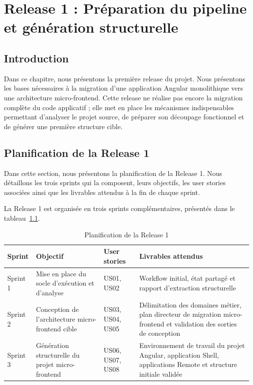 \chapter{Release 1 : Préparation du pipeline et génération structurelle}

\section*{Introduction}

Dans ce chapitre, nous présentons la première release du projet. Nous présentons les bases nécessaires à la migration d'une application Angular monolithique vers une architecture micro-frontend. Cette release ne réalise pas encore la migration complète du code applicatif ; elle met en place les mécanismes indispensables permettant d'analyser le projet source, de préparer son découpage fonctionnel et de générer une première structure cible.

\section{Planification de la Release 1}

Dans cette section, nous présentons la planification de la Release 1. Nous détaillons les trois sprints qui la composent, leurs objectifs, les user stories associées ainsi que les livrables attendus à la fin de chaque sprint.

La Release 1 est organisée en trois sprints complémentaires, présentés dans le tableau~\ref{tab:planning-release1}.

\begingroup
\renewcommand{\arraystretch}{1.12}
\setlength{\tabcolsep}{4pt}
\begin{longtable}{|p{1.8cm}|p{3.6cm}|p{2.7cm}|p{4.45cm}|}
\caption{Planification de la Release 1}\label{tab:planning-release1}\\
\hline
\textbf{Sprint} & \textbf{Objectif} & \textbf{User stories} & \textbf{Livrables attendus} \\
\hline
Sprint 1 & Mise en place du socle d'exécution et d'analyse & US01, US02 & Workflow initial, état partagé et rapport d'extraction structurelle \\
\hline
Sprint 2 & Conception de l'architecture micro-frontend cible & US03, US04, US05 & Délimitation des domaines métier, plan directeur de migration micro-frontend et validation des sorties de conception \\
\hline
Sprint 3 & Génération structurelle du projet micro-frontend & US06, US07, US08 & Environnement de travail du projet Angular, application Shell, applications Remote et structure initiale validée \\
\hline
\end{longtable}
\endgroup


